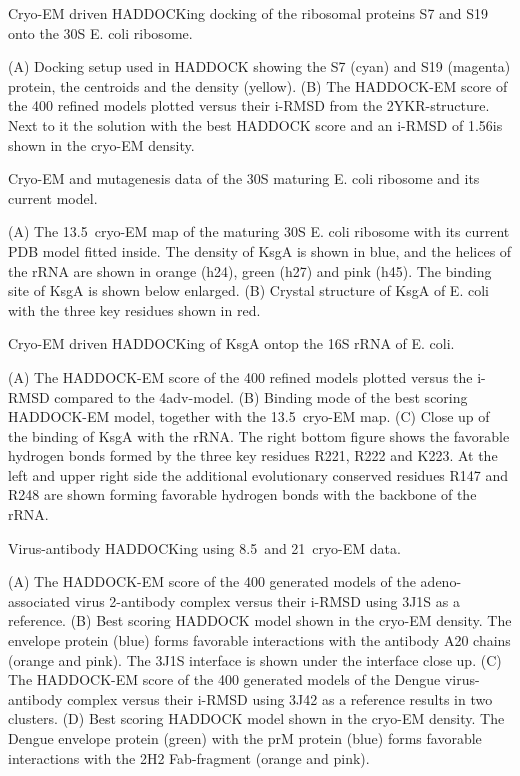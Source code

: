 \caption{Cryo-EM driven HADDOCKing docking of the ribosomal proteins S7 and S19
onto the 30S E. coli ribosome.} 
{(A) Docking setup used in HADDOCK showing the S7 (cyan) and S19 (magenta)
protein, the centroids and the density (yellow). 
(B) The HADDOCK-EM score of the 400 refined models plotted versus their i-RMSD
from the 2YKR-structure. Next to it the solution with the best HADDOCK score
and an i-RMSD of 1.56\Angstrom is shown in the cryo-EM density.} 
\stopbuffer


\caption{Cryo-EM and mutagenesis data of the 30S maturing E. coli ribosome and
its current model.}
{(A) The 13.5\Angstrom\ cryo-EM map of the maturing 30S E. coli ribosome with its
current PDB model fitted inside. The density of KsgA is shown in blue, and the
helices of the rRNA are shown in orange (h24), green (h27) and pink (h45). The
binding site of KsgA is shown below enlarged.
(B) Crystal structure of KsgA of E. coli with the three key residues shown in
red.}
\stopbuffer


\caption{Cryo-EM driven HADDOCKing of KsgA ontop the 16S rRNA of E. coli.}
{(A) The HADDOCK-EM score of the 400 refined models plotted versus the i-RMSD
compared to the 4adv-model. 
(B) Binding mode of the best scoring HADDOCK-EM model, together with the 13.5\Angstrom\
cryo-EM map.
(C) Close up of the binding of KsgA with the rRNA. The right bottom figure
shows the favorable hydrogen bonds formed by the three key residues R221, R222
and K223. At the left and upper right side the additional evolutionary
conserved residues R147 and R248 are shown forming favorable hydrogen bonds
with the backbone of the rRNA.}
\stopbuffer


\caption{Virus-antibody HADDOCKing using 8.5\Angstrom\ and 21\Angstrom\ cryo-EM
data.}
{ (A) The HADDOCK-EM score of the 400 generated models of the adeno-associated
virus 2-antibody complex versus their i-RMSD using 3J1S as a reference.
(B) Best scoring HADDOCK model shown in the cryo-EM density. The envelope
protein (blue) forms favorable interactions with the antibody A20 chains
(orange and pink). The 3J1S interface is shown under the interface close up. 
(C) The HADDOCK-EM score of the 400 generated models of the Dengue
virus-antibody complex versus their i-RMSD using 3J42 as a reference results
in two clusters.
(D) Best scoring HADDOCK model shown in the cryo-EM density. The Dengue
envelope protein (green) with the prM protein (blue) forms favorable
interactions with the 2H2 Fab-fragment (orange and pink).}
\stopbuffer


